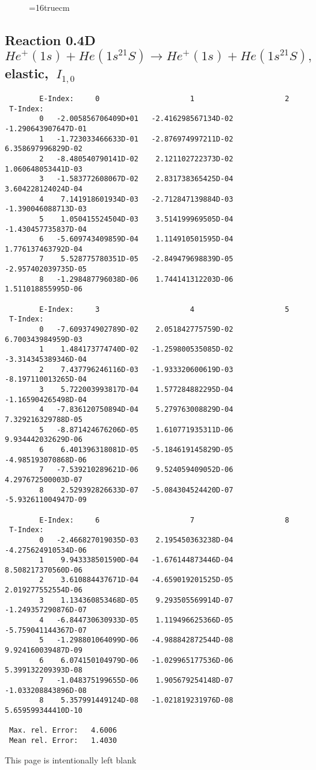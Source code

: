 \documentclass[12pt,dvipdfmx]{article}
\begin{document}
\begin{figure} \label{0.4T}
\epsfxsize=16truecm
\end{figure}
\newpage

\subsection{
Reaction 0.4D  $He^+(1s) + He(1s^21S) \rightarrow He^+(1s) + He(1s^21S) ,\ $
 elastic, $\  I_{1,0}$
}

\begin{small}\begin{verbatim}
        E-Index:     0                     1                     2
 T-Index:
        0   -2.005856706409D+01   -2.416298567134D-02   -1.290643907647D-01
        1   -1.723033466633D-01   -2.876974997211D-02    6.358697996829D-02
        2   -8.480540790141D-02    2.121102722373D-02    1.060648053441D-03
        3   -1.583772608067D-02    2.831738365425D-04    3.604228124024D-04
        4    7.141918601934D-03   -2.712847139884D-03   -1.390046088713D-03
        5    1.050415524504D-03    3.514199969505D-04   -1.430457735837D-04
        6   -5.609743409859D-04    1.114910501595D-04    1.776137463792D-04
        7    5.528775780351D-05   -2.849479698839D-05   -2.957402039735D-05
        8   -1.298487796038D-06    1.744141312203D-06    1.511018855995D-06

        E-Index:     3                     4                     5
 T-Index:
        0   -7.609374902789D-02    2.051842775759D-02    6.700343984959D-03
        1    1.484173774740D-02   -1.259800535085D-02   -3.314345389346D-04
        2    7.437796246116D-03   -1.933320600619D-03   -8.197110013265D-04
        3    5.722003993817D-04    1.577284882295D-04   -1.165904265498D-04
        4   -7.836120750894D-04    5.279763008829D-04    7.329216329788D-05
        5   -8.871424676206D-05    1.610771935311D-06    9.934442032629D-06
        6    6.401396318081D-05   -5.184619145829D-05   -4.985193070868D-06
        7   -7.539210289621D-06    9.524059409052D-06    4.297672500003D-07
        8    2.529392826633D-07   -5.084304524420D-07   -5.932611004947D-09

        E-Index:     6                     7                     8
 T-Index:
        0   -2.466827019035D-03    2.195450363238D-04   -4.275624910534D-06
        1    9.943338501590D-04   -1.676144873446D-04    8.508217370560D-06
        2    3.610884437671D-04   -4.659019201525D-05    2.019277552554D-06
        3    1.134360853468D-05    9.293505569914D-07   -1.249357290876D-07
        4   -6.844730630933D-05    1.119496625366D-05   -5.759041144367D-07
        5   -1.298801064099D-06   -4.988842872544D-08    9.924160039487D-09
        6    6.074150104979D-06   -1.029965177536D-06    5.399132209393D-08
        7   -1.048375199655D-06    1.905679254148D-07   -1.033208843896D-08
        8    5.357991449124D-08   -1.021819231976D-08    5.659599344410D-10

 Max. rel. Error:   4.6006
 Mean rel. Error:   1.4030

\end{verbatim}\end{small}
\newpage
This page is intentionally left blank
\newpage
\end{document}
